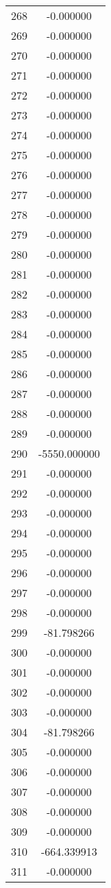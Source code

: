 \documentclass[12pt]{article}
\begin{document}
\begin{longtable}{@{}cc@{}}
268 & -0.000000 \\
269 & -0.000000 \\
270 & -0.000000 \\
271 & -0.000000 \\
272 & -0.000000 \\
273 & -0.000000 \\
274 & -0.000000 \\
275 & -0.000000 \\
276 & -0.000000 \\
277 & -0.000000 \\
278 & -0.000000 \\
279 & -0.000000 \\
280 & -0.000000 \\
281 & -0.000000 \\
282 & -0.000000 \\
283 & -0.000000 \\
284 & -0.000000 \\
285 & -0.000000 \\
286 & -0.000000 \\
287 & -0.000000 \\
288 & -0.000000 \\
289 & -0.000000 \\
290 & -5550.000000 \\
291 & -0.000000 \\
292 & -0.000000 \\
293 & -0.000000 \\
294 & -0.000000 \\
295 & -0.000000 \\
296 & -0.000000 \\
297 & -0.000000 \\
298 & -0.000000 \\
299 & -81.798266 \\
300 & -0.000000 \\
301 & -0.000000 \\
302 & -0.000000 \\
303 & -0.000000 \\
304 & -81.798266 \\
305 & -0.000000 \\
306 & -0.000000 \\
307 & -0.000000 \\
308 & -0.000000 \\
309 & -0.000000 \\
310 & -664.339913 \\
311 & -0.000000 \\

\end{longtable}
\end{document}
